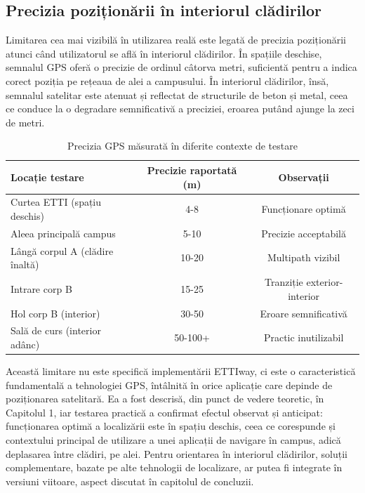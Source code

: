 \subsection{Precizia poziționării în interiorul clădirilor}
\label{subsec:limitare-gps}

Limitarea cea mai vizibilă în utilizarea reală este legată de precizia
poziționării atunci când utilizatorul se află în interiorul clădirilor. În
spațiile deschise, semnalul GPS oferă o precizie de ordinul câtorva metri,
suficientă pentru a indica corect poziția pe rețeaua de alei a campusului. În
interiorul clădirilor, însă, semnalul satelitar este atenuat și reflectat de
structurile de beton și metal, ceea ce conduce la o degradare semnificativă a
preciziei, eroarea putând ajunge la zeci de metri.

\begin{table}[htbp]
    \centering
    
    \label{tab:precizie-gps}
    \begin{tabular}{lcc}
        \toprule
        \textbf{Locație testare} & \textbf{Precizie raportată (m)} & \textbf{Observații} \\
        \midrule
        Curtea ETTI (spațiu deschis)          & 4-8        & Funcționare optimă \\
        Aleea principală campus               & 5-10       & Precizie acceptabilă \\
        Lângă corpul A (clădire înaltă)       & 10-20      & Multipath vizibil \\
        Intrare corp B                        & 15-25      & Tranziție exterior-interior \\
        Hol corp B (interior)                 & 30-50      & Eroare semnificativă \\
        Sală de curs (interior adânc)         & 50-100+    & Practic inutilizabil \\
        \bottomrule
    \end{tabular}
    \caption{Precizia GPS măsurată în diferite contexte de testare}
\end{table}


Această limitare nu este specifică implementării ETTIway, ci este o caracteristică
fundamentală a tehnologiei GPS, întâlnită în orice aplicație care depinde de
poziționarea satelitară. Ea a fost descrisă, din punct de vedere teoretic, în
Capitolul 1, iar testarea practică a confirmat efectul observat și anticipat:
funcționarea optimă a localizării este în spațiu deschis, ceea ce corespunde și
contextului principal de utilizare a unei aplicații de navigare în campus,
adică deplasarea între clădiri, pe alei. Pentru orientarea în interiorul clădirilor,
soluții complementare, bazate pe alte tehnologii de localizare, ar putea fi
integrate în versiuni viitoare, aspect discutat în capitolul de concluzii.


